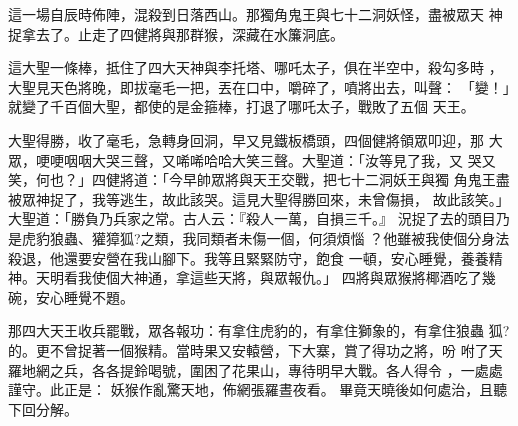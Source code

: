 \begin{pinyinscope}
{這一場自辰時佈陣，混殺到日落西山。那獨角鬼王與七十二洞妖怪，盡被眾天
神捉拿去了。止走了四健將與那群猴，深藏在水簾洞底。

這大聖一條棒，抵住了四大天神與李托塔、哪吒太子，俱在半空中，殺勾多時
，大聖見天色將晚，即拔毫毛一把，丟在口中，嚼碎了，噴將出去，叫聲：
「變！」就變了千百個大聖，都使的是金箍棒，打退了哪吒太子，戰敗了五個
天王。

大聖得勝，收了毫毛，急轉身回洞，早又見鐵板橋頭，四個健將領眾叩迎，那
大眾，哽哽咽咽大哭三聲，又唏唏哈哈大笑三聲。大聖道：「汝等見了我，又
哭又笑，何也？」四健將道：「今早帥眾將與天王交戰，把七十二洞妖王與獨
角鬼王盡被眾神捉了，我等逃生，故此該哭。這見大聖得勝回來，未曾傷損，
故此該笑。」大聖道：「勝負乃兵家之常。古人云：『殺人一萬，自損三千。』
況捉了去的頭目乃是虎豹狼蟲、獾獐狐?之類，我同類者未傷一個，何須煩惱
？他雖被我使個分身法殺退，他還要安營在我山腳下。我等且緊緊防守，飽食
一頓，安心睡覺，養養精神。天明看我使個大神通，拿這些天將，與眾報仇。」
四將與眾猴將椰酒吃了幾碗，安心睡覺不題。

那四大天王收兵罷戰，眾各報功：有拿住虎豹的，有拿住獅象的，有拿住狼蟲
狐?的。更不曾捉著一個猴精。當時果又安轅營，下大寨，賞了得功之將，吩
咐了天羅地網之兵，各各提鈴喝號，圍困了花果山，專待明早大戰。各人得令
，一處處謹守。此正是：
       妖猴作亂驚天地，佈網張羅晝夜看。
       畢竟天曉後如何處治，且聽下回分解。





}
\end{pinyinscope}
